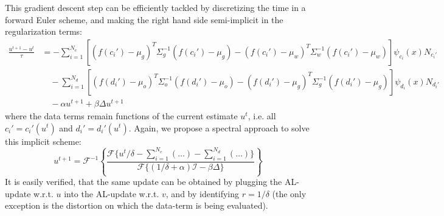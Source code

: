 This gradient descent step can be efficiently tackled by discretizing the time in a forward Euler scheme, and making the right hand side semi-implicit in the regularization terms:
\begin{align}
\frac{u^{t+1}-u^t}{\tau} &= - \sum_{i=1}^{N_c} \left[(f(c_i')-\mu_g)^T\Sigma_g^{-1}(f(c_i')-\mu_g) - (f(c_i')-\mu_w)^T\Sigma_w^{-1}(f(c_i')-\mu_w)\right]\psi_{c_i}(x)N_{c_i'}\nonumber\\
&\quad -\sum_{i=1}^{N_d} \left[(f(d_i')-\mu_o)^T\Sigma_o^{-1}(f(d_i')-\mu_o) - (f(d_i')-\mu_g)^T\Sigma_g^{-1}(f(d_i')-\mu_g)\right]\psi_{d_i}(x)N_{d_i'}\nonumber\\
&\quad -\alpha u^{t+1} + \beta\Delta u^{t+1}
\end{align}
where the data terms remain functions of the current estimate $u^t$, i.e. all $c_i' = c_i'(u^t)$ and $d_i' = d_i'(u^t)$. Again, we propose a spectral approach to solve this implicit scheme:
\begin{equation}
u^{t+1} = \mathcal{F}^{-1}\left\{ \frac{\mathcal{F}\{u^t/\delta - \sum_{i=1}^{N_c}(\ldots) - \sum_{i=1}^{N_d}(\ldots)  \}}{\mathcal{F}\{(1/\delta+\alpha)\mathcal{I}-\beta\Delta\}} \right\}
\end{equation}
It is easily verified, that the same update can be obtained by plugging the AL-update w.r.t. $u$ into the AL-update w.r.t. $v$, and by identifying $r = 1/\delta$ (the only exception is the distortion on which the data-term is being evaluated).

